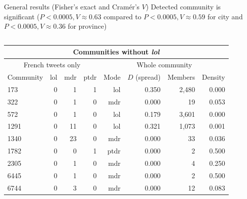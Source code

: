 \documentclass{beamer}\usepackage[]{graphicx}\usepackage[]{color}
\newcommand{\lexi}[1]{\textit{#1}}
\begin{document}
\begin{frame}
\begin{columns}[t]
        \begin{block}{General results (Fisher's exact and Cramér's $V$)}
          Detected community is significant ($P < 0.0005, V \approx 0.63$ compared to $P < 0.0005, V \approx 0.59$ for city and $P < 0.0005, V \approx 0.36$ for province)
          \begin{columns}[t]
              \begin{center}
                \begin{tabular}{l r r r | r r r r}
                  \multicolumn{8}{c}{Communities without \lexi{lol}} \\
                  \hline
                  \multicolumn{4}{c}{French tweets only}                                                                                             & \multicolumn{4}{c}{Whole community} \\
                  Community & lol                                   & mdr                                   & ptdr                                   & Mode & $D$ (spread) & Members & Density \\
                  \hline
                  173       & 0  & 1  & 1  & lol  & 0.350        & 2,480   & 0.000 \\
                  322       & 0  & 1  & 0  & mdr  & 0.000        & 19      & 0.053 \\
                  572       & 0  & 1  & 0  & lol  & 0.179        & 3,601   & 0.000 \\
                  1291      & 0 & 11 & 0 & lol  & 0.321        & 1,073   & 0.001 \\
                  1340      & 0 & 23 & 0 & mdr  & 0.000        & 33      & 0.036 \\
                  1782      & 0 & 0 & 1 & ptdr & 0.000        & 2       & 0.500 \\
                  2305      & 0 & 1 & 0 & mdr  & 0.000        & 4       & 0.250 \\
                  6445      & 0 & 1 & 0 & mdr  & 0.000        & 2       & 0.500 \\
                  6744      & 0 & 3 & 0 & mdr  & 0.000        & 12      & 0.083
                \end{tabular}
              \end{center}
              \begin{center}

\end{center}
\end{columns}
\end{block}
\end{columns}
\end{frame}
\end{document}
